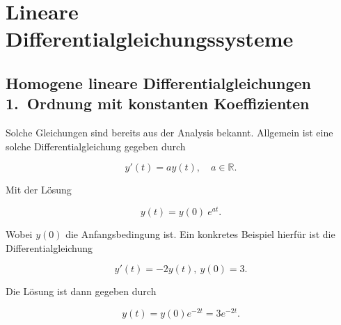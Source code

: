 \setcounter{section}{9}
\section{Lineare Differentialgleichungssysteme}

\subsection{Homogene lineare Differentialgleichungen 1.\ Ordnung mit konstanten Koeffizienten}

Solche Gleichungen sind bereits aus der Analysis bekannt. Allgemein ist eine solche Differentialgleichung gegeben durch

\begin{equation*}
    y'(t)=ay(t), \quad a \in \mathbb{R}.
\end{equation*}

Mit der Lösung

\begin{equation*}
    y(t)= y(0) \ e^{at}.
\end{equation*}

Wobei \( y(0) \) die Anfangsbedingung ist. Ein konkretes Beispiel hierfür ist die Differentialgleichung

\begin{equation*}
    y'(t)=-2y(t),\  y(0) = 3.
\end{equation*}

Die Lösung ist dann gegeben durch 

\begin{figure*}[h]
    \centering
    \begin{minipage}
        {0.5\textwidth}
        \begin{equation*}
            y(t) = y(0) e^{-2t} = 3 e^{-2t}.
        \end{equation*}        
    \end{minipage}
    \hfill
    \begin{minipage}
        {0.45\textwidth}
        \centering
    \end{minipage}
\end{figure*}


